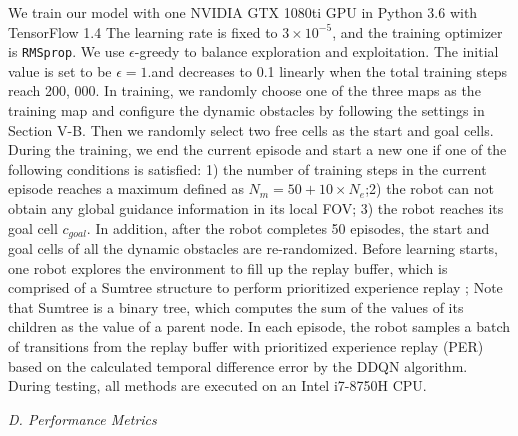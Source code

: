 \documentclass[10pt,twocolumn,letterpaper]{article}
\begin{document}
We train our model with one NVIDIA GTX 1080ti GPU in
Python 3.6 with TensorFlow 1.4 \cite{abadi2016tensorflow}
The learning rate is fixed to $3 \times 10^{-5}$, and the training optimizer is \texttt{RMSprop}. We use $\epsilon$-greedy to balance exploration and exploitation. The initial
value is set to be $\epsilon = 1$.and decreases to 0.1 linearly when the
total training steps reach 200, 000. In training, we randomly
choose one of the three maps as the training map and configure
the dynamic obstacles by following the settings in Section V-B.
Then we randomly select two free cells as the start and goal
cells. During the training, we end the current episode and start
a new one if one of the following conditions is satisfied: 1)
the number of training steps in the current episode reaches a
maximum defined as $N_{m} = 50 + 10 \times N_{e}$;2) the robot can
not obtain any global guidance information in its local FOV;
3) the robot reaches its goal cell $\mathit{c_{goal}}$. In addition, after the
robot completes 50 episodes, the start and goal cells of all the
dynamic obstacles are re-randomized.
Before learning starts, one robot explores the environment
to fill up the replay buffer, which is comprised of a Sumtree
structure to perform prioritized experience replay \cite{schaul2015prioritized}; Note
that Sumtree is a binary tree, which computes the sum of
the values of its children as the value of a parent node. In
each episode, the robot samples a batch of transitions from the
replay buffer with prioritized experience replay (PER) based
on the calculated temporal difference error by the DDQN algorithm. During testing, all methods are executed on an Intel
i7-8750H CPU.

\textit{D. Performance Metrics}
\end{document}
